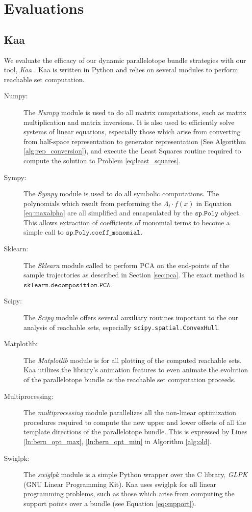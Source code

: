 \chapter{Evaluations}
\section{Kaa}
\label{sec:kaa}
%
We evaluate the efficacy of our dynamic parallelotope bundle strategies with our tool, \emph{Kaa} .
%
Kaa is written in Python and relies on several modules to perform reachable set computation.
\begin{description}
  \item[Numpy:] The \emph{Numpy} module is used to do all matrix computations, such as matrix multiplication and matrix inversions. It is also used to efficiently solve systems of linear equations, especially those which arise from converting from half-space representation to generator representation (See Algorithm \ref{alg:rep_conversion}), and execute the Least Squares routine required to compute the solution to Problem \ref{eq:least_squares}.
  \item[Sympy:] The \emph{Sympy} module is used to do all symbolic computations. The polynomials which result from performing the $\Lambda_i \cdot f(x)$ in Equation \ref{eq:maxalpha} are all simplified and encapsulated by the $\texttt{sp.Poly}$ object. This allows extraction of coefficients of monomial terms to become a simple call to
  $\texttt{sp.Poly.coeff\_monomial}$.
  \item[Sklearn:] The \emph{Sklearn} module called to perform PCA on the end-points of the sample trajectories as described in Section \ref{sec:pca}. The exact method is $\texttt{sklearn.decomposition.PCA}$.
  \item[Scipy:] The \emph{Scipy} module offers several auxiliary routines important to the our analysis of reachable sets, especially \texttt{scipy.spatial.ConvexHull}.
  \item[Matplotlib:] The \emph{Matplotlib} module is for all plotting of the computed reachable sets. Kaa utilizes the library's animation features to even animate the evolution of the parallelotope bundle as the reachable set computation proceeds.
  \item[Multiprocessing:] The \emph{multiprocessing} module parallelizes all the non-linear optimization procedures required to compute the new upper and lower offsets of all the template directions of the parallelotope bundle. This is expressed by Lines \ref{ln:bern_opt_max}, \ref{ln:bern_opt_min} in Algorithm \ref{alg:old}.
  \item[Swiglpk:] The \emph{swiglpk} module is a simple Python wrapper over the C library, \emph{GLPK} (GNU Linear Programming Kit). Kaa uses swiglpk for all linear programming problems, such as those which arise from computing the support points over a bundle (see Equation \ref{eq:support}).
\end{description}

